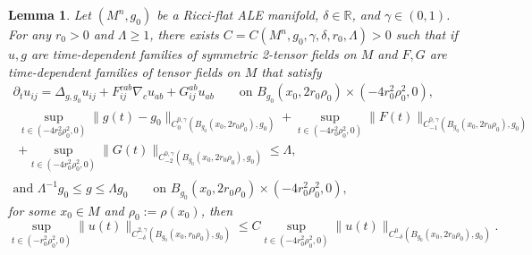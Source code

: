 \documentclass[12pt]{amsart}
\renewcommand{\1}{{\mathbf 1}}
\newcommand{\R}{{\mathbb R}}
\newtheorem{lemma}[thm]{Lemma}
\theoremstyle{others}
\numberwithin{equation}{section}
\begin{document}
\begin{lemma} \label{lem parab smoothing in weighted Holder}
    Let $(M^n, g_0)$ be a Ricci-flat ALE manifold, $\delta \in \R$, and $\gamma \in (0,1)$.
    For any $r_0 > 0$ and $\Lambda \ge 1$, there exists $C = C(M^n, g_0, \gamma, \delta, r_0, \Lambda) > 0$ such that if $u, g$ are time-dependent families of symmetric 2-tensor fields on $M$ and $F,G$ are time-dependent families of tensor fields on $M$ that satisfy
    \begin{gather}
        \label{lem parab smoothing in weighted Holder, eqn 1}
        \partial_t u_{ij} = \Delta_{g, g_0} u_{ij} + F_{ij}^{cab} \nabla_c u_{ab} + G_{ij}^{ab} u_{ab} \qquad \text{on } B_{g_0}(x_0, 2r_0 \rho_0 ) \times (-4r_0^2\rho_0^2, 0), \\
        \label{lem parab smoothing in weighted Holder, eqn 2}
        \begin{split}
            \sup_{t \in (-4r_0^2\rho_0^2 , 0)} \|  g ( t) - g_0\|_{C^{0, \gamma}_{0}( B_{g_0}( x_0, 2 r_0 \rho_0), g_0 ) }+ \sup_{t \in (-4r_0^2\rho_0^2 , 0)} \|  F ( t)\|_{C^{0, \gamma}_{-1}( B_{g_0}( x_0, 2 r_0 \rho_0) , g_0) } \\+ \sup_{t \in (-4r_0^2\rho_0^2, 0)} \|  G( t) \|_{C^{0, \gamma}_{-2}( B_{g_0}( x_0, 2 r_0 \rho_0) , g_0 ) } 
            \le \Lambda,
        \end{split} \\
        \label{lem parab smoothing in weighted Holder, eqn 3^}
        \text{and } \Lambda^{-1} g_0 \le g \le \Lambda g_0 \qquad \text{on } B_{g_0}(x_0, 2r_0 \rho_0 ) \times (-4r_0^2\rho_0^2, 0) ,
    \end{gather}
    for some $x_0 \in M$ and $\rho_0 := \rho(x_0)$,
    then 
    \begin{equation}
         \sup_{t \in(-r_0^2 \rho_0^2 , 0)}  \| u ( t) \|_{C^{2, \gamma}_{-\delta}(B_{g_0}(x_0, r_0 \rho_0) , g_0  )} 
        \le C  \sup_{t \in (-4r_0^2 \rho_0^2 , 0) } \| u ( t) \|_{C^0_{-\delta}(B_{g_0}(x_0, 2r_0 \rho_0)  , g_0)} .
    \end{equation}
\end{lemma}
\end{document}
